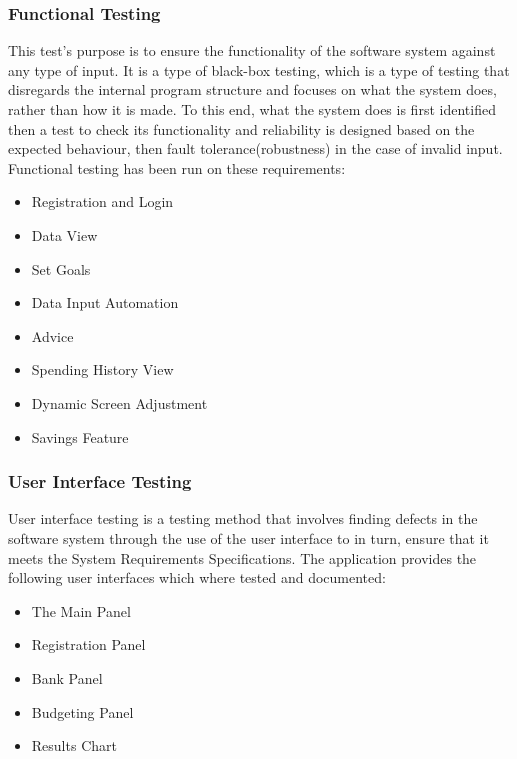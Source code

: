 \documentclass{article}
\begin{document}
\clearpage

\subsubsection{Functional Testing}
This test's purpose is to ensure the functionality of the software system against any type of input. It is a type of black-box testing, which is a type of testing that disregards the internal program structure and focuses on what the system does, rather than how it is made. To this end, what the system does is first identified then a test to check its functionality and reliability is designed based on the expected behaviour, then fault tolerance(robustness) in the case of invalid input.
Functional testing has been run on these requirements:
\begin{itemize}
    \item Registration and Login
    \item Data View
    \item Set Goals
    \item Data Input Automation
    \item Advice
    \item Spending History View
    \item Dynamic Screen Adjustment
    \item Savings Feature
\end{itemize}

\clearpage

\subsubsection{User Interface Testing}
User interface testing is a testing method that involves finding  defects in the software system through the use of the user interface to in turn, ensure that it meets the System Requirements Specifications.
\break
The application provides the following user interfaces which where tested and documented:


\begin{itemize}
    \item The Main Panel
    \item Registration Panel
    \item Bank Panel
    \item Budgeting Panel
    \item Results Chart
\end{itemize}

\newpage
\end{document}

